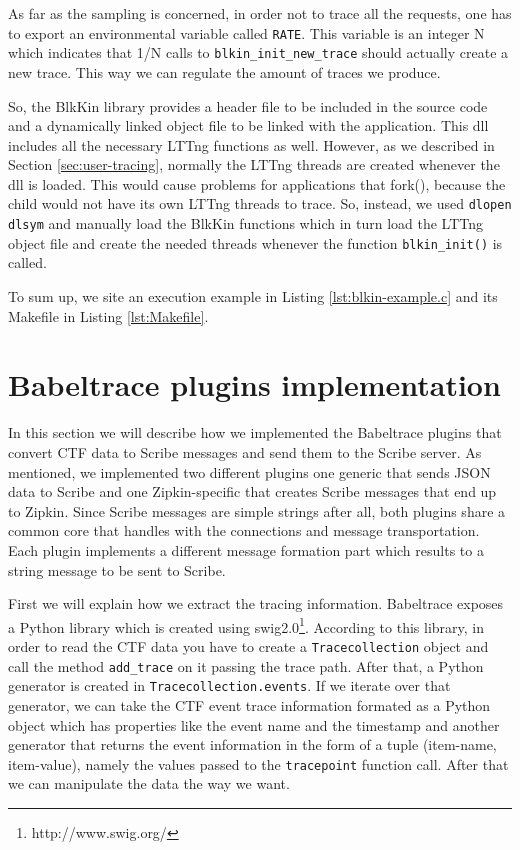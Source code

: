 As far as the sampling is concerned, in order not to trace all the requests, one
has to export an environmental variable called \texttt{RATE}. This variable is
an integer N which indicates that 1/N calls to \texttt{blkin\_init\_new\_trace}
should actually create a new trace. This way we can regulate the amount of
traces we produce.

So, the BlkKin library provides a header file to be included in the source code
and a dynamically linked object file to be linked with the application. This dll
includes all the necessary LTTng functions as well. However, as we described in
Section \ref{sec:user-tracing}, normally the LTTng threads are created whenever
the dll is loaded. This would cause problems for applications that fork(),
because the child would not have its own LTTng threads to trace. So, instead, we
used \texttt{dlopen} \texttt{dlsym} and manually load the BlkKin functions which
in turn load the LTTng object file and create the needed threads whenever the
function \texttt{blkin\_init()} is called.

To sum up, we site an execution example in Listing \ref{lst:blkin-example.c} and
its Makefile in Listing \ref{lst:Makefile}.


\section{Babeltrace plugins implementation}

In this section we will describe how we implemented the Babeltrace plugins that
convert CTF data to Scribe messages and send them to the Scribe server. As
mentioned, we implemented two different plugins one generic that sends JSON data
to Scribe and one Zipkin-specific that creates Scribe messages that end up to
Zipkin. Since Scribe messages are simple strings after all, both plugins share a
common core that handles with the connections and message transportation. Each
plugin implements a different message formation part which results to a string
message to be sent to Scribe.

First we will explain how we extract the tracing information. Babeltrace
exposes a Python library which is created using
swig2.0\footnote{http://www.swig.org/}.  According to this library, in order to
read the CTF data you have to create a \texttt{Tracecollection} object and call
the method \texttt{add\_trace} on it passing the trace path. After that, a
Python generator is created in \texttt{Tracecollection.events}. If we iterate
over that generator, we can take the CTF event trace information formated as a
Python object which has properties like the event name and the timestamp and
another generator that returns the event information in the form of a tuple
(item-name, item-value), namely the values passed to the \texttt{tracepoint}
function call. After that we can manipulate the data the way we want.


